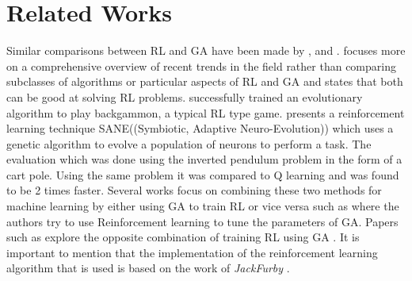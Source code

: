 \section{Related Works}

Similar comparisons between RL and GA have been made by \cite{drugan2019reinforcement},\cite{taylor2006comparing} and \cite{pollack1997coevolution}. \cite{drugan2019reinforcement}  focuses more on a comprehensive overview of recent trends in the field rather than comparing subclasses of algorithms or particular aspects of RL and GA and states that both can be good at solving RL problems. \cite{pollack1997coevolution} successfully trained an evolutionary algorithm to play backgammon, a typical RL type game. \cite{moriarty1996efficient} presents a reinforcement learning technique SANE((Symbiotic, Adaptive Neuro-Evolution)) which uses a genetic algorithm to evolve a population of neurons to perform a task. The evaluation which was done using the inverted pendulum problem in the form of a cart pole. Using the same problem it was compared to Q learning and was found to be 2 times faster. Several works focus on combining these two methods for machine learning by either using GA to train RL or vice versa such as \cite{eiben2007reinforcement} where the authors try to use Reinforcement learning to tune the parameters of GA.  Papers such as  \cite{khadka2018evolutionary} explore the opposite combination of training RL using GA . It is important to mention that the implementation of the reinforcement learning algorithm that is used is based on the work of \textit{JackFurby} \cite{JackFurbyCartPole}. 

